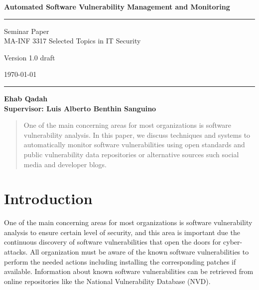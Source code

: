\documentclass{llncs}
\begin{document}
\begin{flushleft}
 
 \thispagestyle{empty}
\centering\LARGE {\bf Automated Software Vulnerability Management and Monitoring }


\rule{\textwidth}{1pt}

\vspace{2pt}


\centering
 Seminar Paper  
 \\MA-INF 3317 Selected Topics in IT Security

{\Large Version 1.0 draft }

\vspace{8pt}
\today

\rule{\textwidth}{1pt}

\vspace{8 cm}

\centering
 \bf Ehab Qadah\\
 
 \vspace{7 pt}
\bf Supervisor: Luis Alberto Benthin Sanguino

\end{flushleft}


\newpage

\tableofcontents

\newpage


\begin{abstract}
One of the main concerning areas for most organizations is software vulnerability analysis. In this paper, we discuss techniques and systems to automatically monitor software vulnerabilities using open standards and public vulnerability data repositories or alternative sources such social media and developer blogs. 
\end{abstract}

\section{Introduction}

\par One of the main concerning areas for most organizations is software vulnerability analysis to ensure certain level of security, and this area is important due the continuous discovery of software vulnerabilities that open the doors for cyber-attacks. All organization must be aware of the known software vulnerabilities to perform the needed actions including installing the corresponding patches if available. Information about known software vulnerabilities can be retrieved from online repositories like the National Vulnerability Database (NVD).
 
\end{document}
